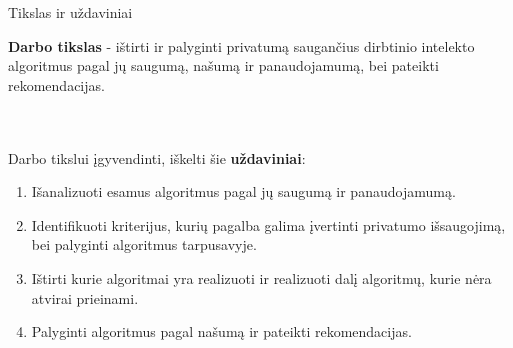 \begin{frame}[c]{Tikslas ir uždaviniai}

\par {\bf Darbo tikslas} - ištirti ir palyginti privatumą saugančius dirbtinio intelekto algoritmus pagal jų saugumą, našumą ir panaudojamumą, bei pateikti rekomendacijas.
\par \\~\\ Darbo tikslui įgyvendinti, iškelti šie {\bf uždaviniai}:
\begin{enumerate}
	\item Išanalizuoti esamus algoritmus pagal jų saugumą ir panaudojamumą.
	\item Identifikuoti kriterijus, kurių pagalba galima įvertinti privatumo išsaugojimą, bei palyginti algoritmus tarpusavyje.
	\item Ištirti kurie algoritmai yra realizuoti ir realizuoti dalį algoritmų, kurie nėra atvirai prieinami.
	\item Palyginti algoritmus pagal našumą ir pateikti rekomendacijas.
\end{enumerate}

\end{frame}